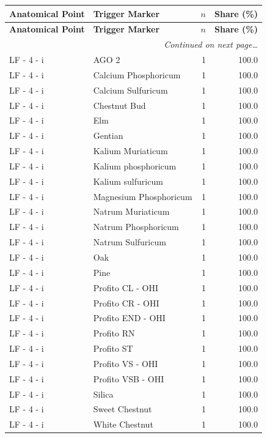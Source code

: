 \documentclass[a4paper,11pt]{article}
\begin{document}
\begin{footnotesize}
\begin{longtable}{p{3.5cm}p{7.5cm}rr}
\toprule
\textbf{Anatomical Point} &
\textbf{Trigger Marker} &
\textbf{$n$} &
\textbf{Share (\%)} \\
\midrule
\endfirsthead
\toprule
\textbf{Anatomical Point} &
\textbf{Trigger Marker} &
\textbf{$n$} &
\textbf{Share (\%)} \\
\midrule
\endhead
\midrule
\multicolumn{4}{r}{\footnotesize\emph{Continued on next page\ldots}} \\
\endfoot
\bottomrule
\endlastfoot
LF - 4 - i & AGO 2 & 1 & 100.0 \\
LF - 4 - i & Calcium Phosphoricum & 1 & 100.0 \\
LF - 4 - i & Calcium Sulfuricum & 1 & 100.0 \\
LF - 4 - i & Chestnut Bud & 1 & 100.0 \\
LF - 4 - i & Elm & 1 & 100.0 \\
LF - 4 - i & Gentian & 1 & 100.0 \\
LF - 4 - i & Kalium Muriaticum & 1 & 100.0 \\
LF - 4 - i & Kalium phosphoricum & 1 & 100.0 \\
LF - 4 - i & Kalium sulfuricum & 1 & 100.0 \\
LF - 4 - i & Magnesium Phosphoricum & 1 & 100.0 \\
LF - 4 - i & Natrum Muriaticum & 1 & 100.0 \\
LF - 4 - i & Natrum Phosphoricum & 1 & 100.0 \\
LF - 4 - i & Natrum Sulfuricum & 1 & 100.0 \\
LF - 4 - i & Oak & 1 & 100.0 \\
LF - 4 - i & Pine & 1 & 100.0 \\
LF - 4 - i & Profito CL - OHI & 1 & 100.0 \\
LF - 4 - i & Profito CR - OHI & 1 & 100.0 \\
LF - 4 - i & Profito END - OHI & 1 & 100.0 \\
LF - 4 - i & Profito RN & 1 & 100.0 \\
LF - 4 - i & Profito ST & 1 & 100.0 \\
LF - 4 - i & Profito VS - OHI & 1 & 100.0 \\
LF - 4 - i & Profito VSB - OHI & 1 & 100.0 \\
LF - 4 - i & Silica & 1 & 100.0 \\
LF - 4 - i & Sweet Chestnut & 1 & 100.0 \\
LF - 4 - i & White Chestnut & 1 & 100.0 \\

\end{longtable}
\end{footnotesize}
\end{document}
